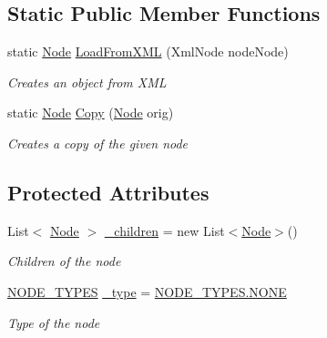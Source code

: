 \subsection*{Static Public Member Functions}
\begin{DoxyCompactItemize}
\item 
static \hyperlink{class_web_analyzer_1_1_models_1_1_settings_model_1_1_expression_tree_1_1_node}{Node} \hyperlink{class_web_analyzer_1_1_models_1_1_settings_model_1_1_expression_tree_1_1_node_a54323c9080efce8ccaac711e191edeec}{Load\+From\+X\+M\+L} (Xml\+Node node\+Node)
\begin{DoxyCompactList}\small\item\em Creates an object from X\+M\+L \end{DoxyCompactList}\item 
static \hyperlink{class_web_analyzer_1_1_models_1_1_settings_model_1_1_expression_tree_1_1_node}{Node} \hyperlink{class_web_analyzer_1_1_models_1_1_settings_model_1_1_expression_tree_1_1_node_a22898ea14ec232d9b7ef9f77f70e7be1}{Copy} (\hyperlink{class_web_analyzer_1_1_models_1_1_settings_model_1_1_expression_tree_1_1_node}{Node} orig)
\begin{DoxyCompactList}\small\item\em Creates a copy of the given node \end{DoxyCompactList}\end{DoxyCompactItemize}
\subsection*{Protected Attributes}
\begin{DoxyCompactItemize}
\item 
List$<$ \hyperlink{class_web_analyzer_1_1_models_1_1_settings_model_1_1_expression_tree_1_1_node}{Node} $>$ \hyperlink{class_web_analyzer_1_1_models_1_1_settings_model_1_1_expression_tree_1_1_node_a08c9f3e82b0a8baeac2db82f16266c60}{\+\_\+children} = new List$<$\hyperlink{class_web_analyzer_1_1_models_1_1_settings_model_1_1_expression_tree_1_1_node}{Node}$>$()
\begin{DoxyCompactList}\small\item\em Children of the node \end{DoxyCompactList}\item 
\hyperlink{class_web_analyzer_1_1_models_1_1_settings_model_1_1_expression_tree_1_1_node_a89c72b19ff778cbc04788f4cb47a730e}{N\+O\+D\+E\+\_\+\+T\+Y\+P\+E\+S} \hyperlink{class_web_analyzer_1_1_models_1_1_settings_model_1_1_expression_tree_1_1_node_ad944bafbeb7287e38bc6bc7826752516}{\+\_\+type} = \hyperlink{class_web_analyzer_1_1_models_1_1_settings_model_1_1_expression_tree_1_1_node_a89c72b19ff778cbc04788f4cb47a730eab50339a10e1de285ac99d4c3990b8693}{N\+O\+D\+E\+\_\+\+T\+Y\+P\+E\+S.\+N\+O\+N\+E}
\begin{DoxyCompactList}\small\item\em Type of the node \end{DoxyCompactList}\end{DoxyCompactItemize}
